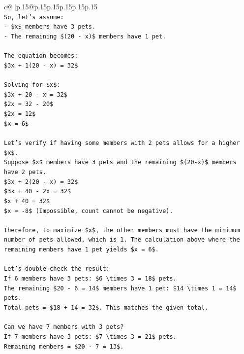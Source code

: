 \documentclass{article}
\begin{document}
{\begin{supertabular}{c@{$\;$}|p{.15\linewidth}@{}p{.15\linewidth}p{.15\linewidth}p{.15\linewidth}p{.15\linewidth}p{.15\linewidth}}
{{{\\ 
\texttt{So, let's assume:} \\
\texttt{{-} \$x\$ members have 3 pets.} \\
\texttt{{-} The remaining \$(20 {-} x)\$ members have 1 pet.} \\
\\ 
\texttt{The equation becomes:} \\
\texttt{\$3x + 1(20 {-} x) = 32\$} \\
\\ 
\texttt{Solving for \$x\$:} \\
\texttt{\$3x + 20 {-} x = 32\$} \\
\texttt{\$2x = 32 {-} 20\$} \\
\texttt{\$2x = 12\$} \\
\texttt{\$x = 6\$} \\
\\ 
\texttt{Let's verify if having some members with 2 pets allows for a higher \$x\$.} \\
\texttt{Suppose \$x\$ members have 3 pets and the remaining \$(20{-}x)\$ members have 2 pets.} \\
\texttt{\$3x + 2(20 {-} x) = 32\$} \\
\texttt{\$3x + 40 {-} 2x = 32\$} \\
\texttt{\$x + 40 = 32\$} \\
\texttt{\$x = {-}8\$ (Impossible, count cannot be negative).} \\
\\ 
\texttt{Therefore, to maximize \$x\$, the other members must have the minimum number of pets allowed, which is 1. The calculation above where the remaining members have 1 pet yields \$x = 6\$.} \\
\\ 
\texttt{Let's double{-}check the result:} \\
\texttt{If 6 members have 3 pets: \$6 \textbackslash{}times 3 = 18\$ pets.} \\
\texttt{The remaining \$20 {-} 6 = 14\$ members have 1 pet: \$14 \textbackslash{}times 1 = 14\$ pets.} \\
\texttt{Total pets = \$18 + 14 = 32\$. This matches the given total.} \\
\\ 
\texttt{Can we have 7 members with 3 pets?} \\
\texttt{If 7 members have 3 pets: \$7 \textbackslash{}times 3 = 21\$ pets.} \\
\texttt{Remaining members = \$20 {-} 7 = 13\$.} \\
}}}
\end{supertabular}}
\end{document}
